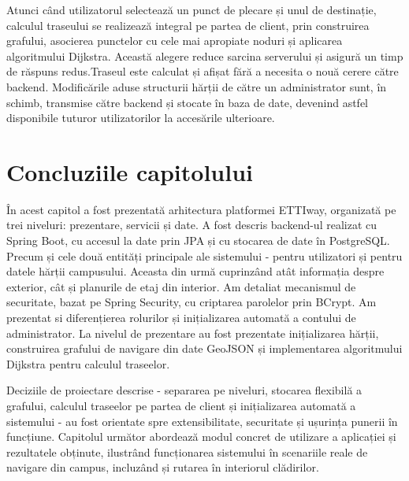 Atunci când utilizatorul selectează un punct de plecare și unul de
destinație, calculul traseului se realizează integral pe partea de client,
prin construirea grafului, asocierea punctelor cu cele mai apropiate noduri
și aplicarea algoritmului Dijkstra. Această alegere reduce sarcina
serverului și asigură un timp de răspuns redus.Traseul este calculat și
afișat fără a necesita o nouă cerere către backend. Modificările aduse
structurii hărții de către un administrator sunt, în schimb, transmise către
backend și stocate în baza de date, devenind astfel disponibile tuturor
utilizatorilor la accesările ulterioare.


\newpage
\section{Concluziile capitolului}
\label{sec:concluzii-cap2}

În acest capitol a fost prezentată arhitectura platformei ETTIway, organizată
pe trei niveluri: prezentare, servicii și date. A fost descris backend-ul
realizat cu Spring Boot, cu accesul la date prin JPA și cu stocarea de date în
PostgreSQL. Precum și cele două entități principale ale sistemului - pentru
utilizatori și pentru datele hărții campusului. Aceasta din urmă cuprinzând
atât informația despre exterior, cât și planurile de etaj din interior. 
Am detaliat mecanismul de securitate, bazat pe Spring Security, cu
criptarea parolelor prin BCrypt. Am prezentat si diferențierea rolurilor și inițializarea
automată a contului de administrator. La nivelul de prezentare au fost
prezentate inițializarea hărții, construirea grafului de navigare din date
GeoJSON și implementarea algoritmului Dijkstra pentru calculul traseelor.

Deciziile de proiectare descrise - separarea pe niveluri, stocarea flexibilă
a grafului, calculul traseelor pe partea de client și inițializarea automată
a sistemului - au fost orientate spre extensibilitate, securitate și ușurința
punerii în funcțiune. Capitolul următor abordează
modul concret de utilizare a aplicației și rezultatele obținute, ilustrând
funcționarea sistemului în scenariile reale de navigare din campus,
incluzând și rutarea în interiorul clădirilor.
